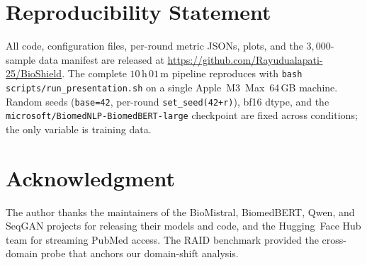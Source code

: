 \documentclass[conference]{IEEEtran}
\begin{document}
\section*{Reproducibility Statement}
All code, configuration files, per-round metric JSONs, plots, and the
\(3{,}000\)-sample data manifest are released at
\url{https://github.com/Rayudualapati-25/BioShield}. The complete
\(10\,\mathrm{h}\,01\,\mathrm{m}\) pipeline reproduces with
\texttt{bash scripts/run\_presentation.sh} on a single Apple~M3~Max~64\,GB
machine. Random seeds (\texttt{base=42}, per-round
\texttt{set\_seed(42+r)}), bf16 dtype, and the
\texttt{microsoft/BiomedNLP-BiomedBERT-large} checkpoint are fixed across
conditions; the only variable is training data.

\section*{Acknowledgment}
The author thanks the maintainers of the BioMistral, BiomedBERT, Qwen, and
SeqGAN projects for releasing their models and code, and the Hugging~Face Hub
team for streaming PubMed access. The RAID benchmark
\cite{dugan2024raid} provided the cross-domain probe that anchors our
domain-shift analysis.



\end{document}
